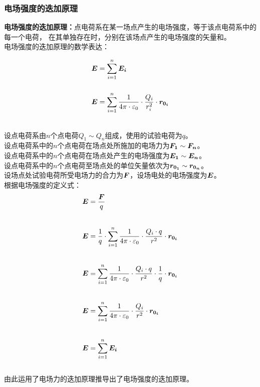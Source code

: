 \documentclass[UTF8]{ctexart}
\newcommand*{\veb}[1]{\vb*{#1}}
\begin{document}
\newpage

\subsubsection{电场强度的迭加原理}
    \setcounter{equation}{0}
    \textbf{电场强度的迭加原理：}点电荷系在某一场点产生的电场强度，等于该点电荷系中的每一个电荷，
    在其单独存在时，分别在该场点产生的电场强度的矢量和。\\[3mm]
    电场强度的迭加原理的数学表达：
    \begin{large}
        \begin{align*}
            &\veb{E}=\sum_{i=1}^{n}\veb{E_i}\\[5mm]
            &\veb{E}=\sum_{i=1}^{n}\frac{1}{4\pi\cdot\varepsilon_0}\cdot\frac{Q_i}{r_i^2}\cdot\veb{r_{0_i}}
        \end{align*}
    \end{large}\\
    设点电荷系由$n$个点电荷$Q_1\sim Q_n$组成，使用的试验电荷为$q$。\\[3mm]
    设点电荷系中的$n$个点电荷在场点处所施加的电场力为$\veb{F_1}\sim \veb{F_n}$。\\[3mm]
    设点电荷系中的$n$个点电荷在场点处产生的电场强度为$\veb{E_1}\sim \veb{E_n}$。\\[3mm]
    设点电荷系中的$n$个点电荷至场点处的单位矢量依次为$\veb{r_{0_1}}\sim\veb{r_{0_n}}$。\\[3mm]
    设场点处试验电荷所受电场力的合力为$\veb{F}$，设场电处的电场强度为$\veb{E}$。\\[8mm]
    根据电场强度的定义式：
    \begin{align}
        &\veb{E}=\frac{\veb{F}}{q}\\[7mm]
        &\veb{E}=\frac{1}{q}\cdot\sum_{i=1}^{n}\frac{1}{4\pi\cdot\varepsilon_0}\cdot\frac{Q_i\cdot q}{r^2}\cdot\veb{r_{0_i}}\\[7mm]
        &\veb{E}=\sum_{i=1}^{n}\frac{1}{4\pi\cdot\varepsilon_0}\cdot\frac{Q_i\cdot q}{r^2}\cdot\frac{1}{q}\cdot\veb{r_{0_i}}\\[7mm]
        &\veb{E}=\sum_{i=1}^{n}\frac{1}{4\pi\cdot\varepsilon_0}\cdot\frac{Q_i}{r^2}\cdot\veb{r_{0_i}}\\[7mm]
        &\veb{E}=\sum_{i=1}^{n}\veb{E_i}
    \end{align}\\
    由此运用了电场力的迭加原理推导出了电场强度的迭加原理。

\newpage
\end{document}
